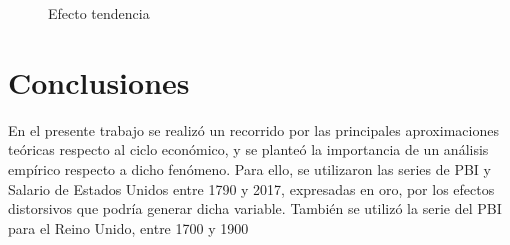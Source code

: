 \documentclass[a4paper]{article}
\begin{document}
\begin{figure}[H]
	\centering
	\caption{Efecto tendencia} \label{fig:espect_tendencias}

\end{figure}





\section{Conclusiones}

En el presente trabajo se realizó un recorrido por las principales aproximaciones teóricas respecto al ciclo económico, y se planteó la importancia de un análisis empírico respecto a dicho fenómeno. Para ello, se utilizaron las series de PBI y Salario de Estados Unidos entre 1790 y 2017, expresadas en oro, por los efectos distorsivos que podría generar dicha variable. También se utilizó la serie del PBI para el Reino Unido, entre 1700 y 1900
\end{document}
